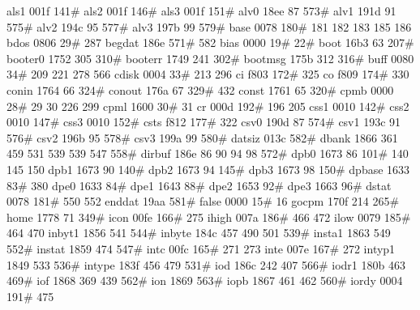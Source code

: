 als1            001f    141#
als2            001f    146#
als3            001f    151#
alv0            18ee     87     573#
alv1            191d     91     575#
alv2            194c     95     577#
alv3            197b     99     579#
base            0078    180#    181     182     183    185    186
bdos            0806     29#    287
begdat          186e    571#    582
bias            0000     19#     22#
boot            16b3     63     207#
booter0         1752    305     310#
booterr         1749    241     302#
bootmsg         175b    312     316#
buff            0080     34#    209     221     278     566
cdisk           0004     33#    213     296
ci              f803    172#    325
co              f809    174#    330
conin           1764     66     324#
conout          176a     67     329#    432
const           1761     65     320#
cpmb            0000     28#     29      30     226     299
cpml            1600     30#     31
cr              000d    192#    196     205
css1            0010    142#
css2            0010    147#
css3            0010    152#
csts            f812    177#    322
csv0            190d     87     574#
csv1            193c     91     576#
csv2            196b     95     578#
csv3            199a     99     580#
datsiz          013c    582#
dbank           1866    361     459     531     539     539     547     558#
dirbuf          186e     86      90      94      98     572#
dpb0            1673     86     101#    140     145     150
dpb1            1673     90     140#
dpb2            1673     94     145#
dpb3            1673     98     150#
dpbase          1633     83#    380
dpe0            1633     84#
dpe1            1643     88#
dpe2            1653     92#
dpe3            1663     96#
dstat           0078    181#    550     552
enddat          19aa    581#
false           0000     15#     16
gocpm           170f    214     265#
home            1778     71     349#
icon            00fe    166#    275
ihigh           007a    186#    466     472
ilow            0079    185#    464     470
inbyt1          1856    541     544#
inbyte          184c    457     490     501     539#
insta1          1863    549     552#
instat          1859    474     547#
intc            00fc    165#    271     273
inte            007e    167#    272
intyp1          1849    533     536#
intype          183f    456     479     531#
iod             186c    242     407     566#
iodr1           180b    463     469#
iof             1868    369     439     562#
ion             1869    563#
iopb            1867    461     462     560#
iordy           0004    191#    475
